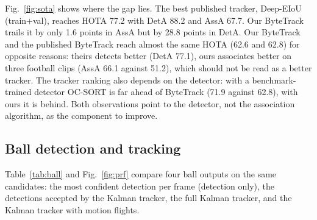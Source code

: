 \documentclass[11pt,a4paper]{article}
\begin{document}
Fig.~\ref{fig:sota} shows where the gap lies. The best published tracker,
Deep-EIoU (train+val), reaches HOTA 77.2 with DetA 88.2
and AssA 67.7. Our ByteTrack trails it by only 1.6 points in
AssA but by 28.8 points in DetA. Our ByteTrack and the published
ByteTrack reach almost the same HOTA (62.6 and 62.8) for
opposite reasons: theirs detects better (DetA 77.1), ours associates
better on three football clips (AssA 66.1 against
51.2), which should not be read as a better tracker. The tracker
ranking also depends on the detector: with a benchmark-trained detector OC-SORT
is far ahead of ByteTrack (71.9 against 62.8), with ours
it is behind. Both observations point to the detector, not the association
algorithm, as the component to improve.

\subsection{Ball detection and tracking}
Table~\ref{tab:ball} and Fig.~\ref{fig:prf} compare four ball outputs on the same
candidates: the most confident detection per frame (detection only), the
detections accepted by the Kalman tracker, the full Kalman tracker, and the
Kalman tracker with motion flights.
\end{document}
